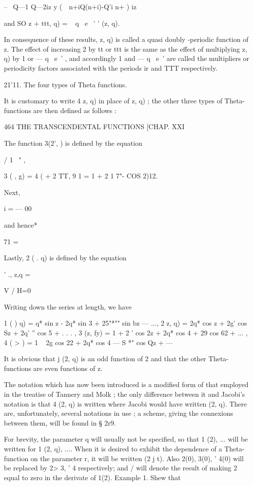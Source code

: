 -- \ Q—1 Q—2iz y (\ \ n+iQ(n+i)-Q'i n+ ) iz

and SO z + ttt, q) = ~ q~ e~ ' ' (z, q).

In consequence of these results, z, q) is called a quasi doubly
-periodic function of z. The effect of increasing 2 by tt or ttt is
the same as the effect of multiplying z, q) by 1 or — q~ e~' , and
accordingly 1 and — q~ e~' are called the multipliers or periodicity
factors associated with the periods ir and TTT respectively.

21'11. The four types of Theta functions.

It is customary to write 4 z, q) in place of z, q) ; the other three
types of Theta-functions are then defined as follows :



464 THE TRANSCENDENTAL FUNCTIONS [CHAP. XXI

The function 3(2', ) is defined by the equation

/ 1 \ " ,

 3 ( , g) = 4 ( + 2 TT, 9 1 = 1 + 2 1 7"- COS 2)12.

Next, %

 i = — 00

and hence* %

71 =

Lastly, 2 ( . q) is defined by the equation

' ., z,q = %

V / H=0

Writing down the series at length, we have

 1 ( ) q) = q* sin z - 2q* sin 3 + 25"*"" sin bz — ..., 2 z, q) = 2q*
cos z + 2g' cos Sz + 2q' '' cos 5 + . . . , 3 (z, fy) = 1 + 2 ' cos 2z
+ 2q* cos 4 + 29 cos 62 + ... , 4 ( > ) = 1 ~ 2g cos 22 + 2q* cos 4 —
S *" cos Qz + —

It is obvious that j (2, q) is an odd function of 2 and that the other
Theta-functions are even functions of z.

The notation which has now been introduced is a modified form of that
employed in the treatise of Tannery and Molk ; the only difference
between it and Jacobi's notation is that 4 (2, q) is written where
Jacobi would have written (2, q). There are, unfortunately, several
notations in use ; a scheme, giving the connexions between them, will
be found in § 2r9.

For brevity, the parameter q will usually not be specified, so that 1
(2), ... will be written for 1 (2, q), .... When it is desired to
exhibit the dependence of a Theta-function on the parameter r, it will
be written (2 j t). Also 2(0), 3(0), ' 4(0) will be replaced by 2> 3,
' 4 respectively; and / will denote the result of making 2 equal to
zero in the derivate of 1(2). Example 1. Shew that

